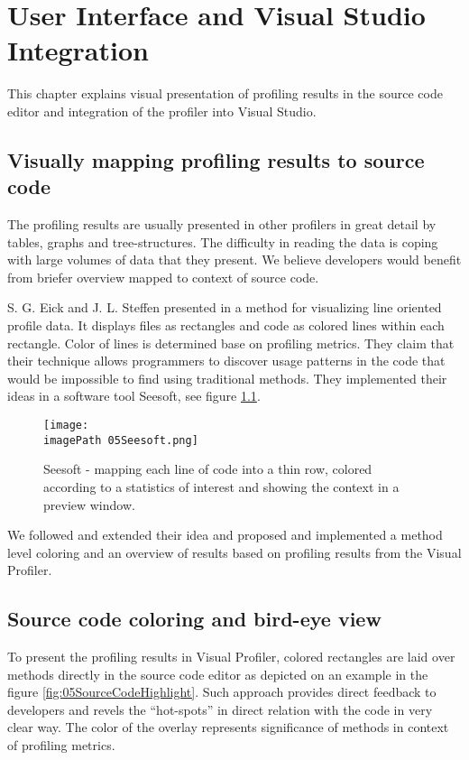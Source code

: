 \chapter{User Interface and Visual Studio Integration }
\label{chap:VPUIandSI}


This chapter explains visual presentation of profiling results in the source code editor and integration of the profiler into Visual Studio.

\section{Visually mapping profiling results to source code}
The profiling results are usually presented in other profilers in great detail by tables, graphs and tree-structures. The difficulty in reading the data is coping with large volumes of data that they present. We believe developers would benefit from briefer overview mapped to context of source code.

S. G. Eick and J. L. Steffen presented in \cite{EickSteffen92} a method for visualizing line oriented profile data. It displays files as rectangles and code as colored lines within each rectangle. Color of lines is determined base on profiling metrics. They claim that their technique allows programmers to discover usage patterns in the code that would be impossible to find using traditional methods. They implemented their ideas in a software tool Seesoft, see figure \ref{fig:05SeeSoft}.

\begin{figure}
	\centering
		\texttt{[image: \\imagePath 05Seesoft.png]}
		\caption{Seesoft - mapping each line of code into a thin row, colored according to a statistics of interest and showing the context in a preview window.}
	\label{fig:05SeeSoft}
\end{figure}


We followed and extended their idea and proposed and implemented a method level coloring and an overview of results based on profiling results from the Visual Profiler. 

\section{Source code coloring and bird-eye view}
To present the profiling results in Visual Profiler, colored rectangles are laid over methods directly in the source code editor as depicted on an example in the figure \ref{fig:05SourceCodeHighlight}. Such approach provides direct feedback to developers and revels the ``hot-spots'' in direct relation with the code in very clear way.  The color of the overlay represents significance of methods in context of profiling metrics.

